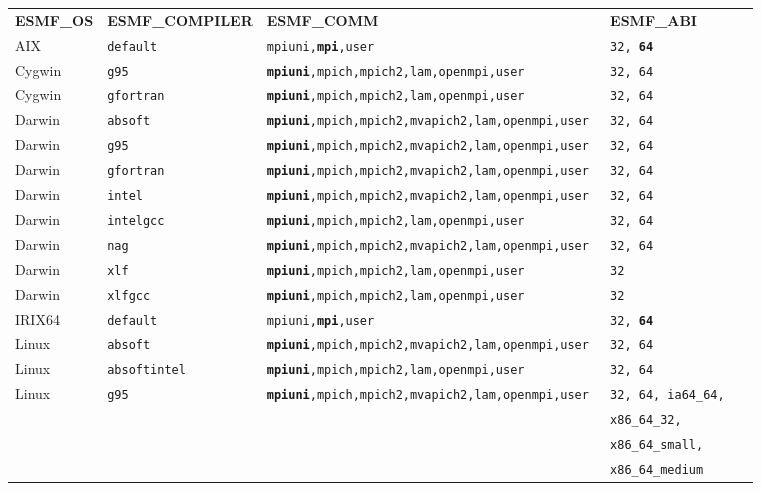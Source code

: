 \begin{tabular}{lllll}
  {\bfseries\footnotesize ESMF\_OS} &{\bfseries\footnotesize ESMF\_COMPILER} & {\bfseries\footnotesize ESMF\_COMM} & {\bfseries\footnotesize ESMF\_ABI} \\

AIX     &\tt default     &\tt mpiuni,{\bf mpi},user      &\tt 32, {\bf 64} \\
Cygwin  &\tt g95         &\tt {\bf mpiuni},mpich,mpich2,lam,openmpi,user &\tt 32, 64 \\
Cygwin  &\tt gfortran    &\tt {\bf mpiuni},mpich,mpich2,lam,openmpi,user &\tt 32, 64 \\
Darwin  &\tt absoft      &\tt {\bf mpiuni},mpich,mpich2,mvapich2,lam,openmpi,user &\tt 32, 64 \\
Darwin  &\tt g95         &\tt {\bf mpiuni},mpich,mpich2,mvapich2,lam,openmpi,user &\tt 32, 64 \\
Darwin  &\tt gfortran    &\tt {\bf mpiuni},mpich,mpich2,mvapich2,lam,openmpi,user &\tt 32, 64 \\
Darwin  &\tt intel       &\tt {\bf mpiuni},mpich,mpich2,mvapich2,lam,openmpi,user &\tt 32, 64 \\
Darwin  &\tt intelgcc    &\tt {\bf mpiuni},mpich,mpich2,lam,openmpi,user &\tt 32, 64 \\
Darwin  &\tt nag         &\tt {\bf mpiuni},mpich,mpich2,mvapich2,lam,openmpi,user &\tt 32, 64 \\
Darwin  &\tt xlf         &\tt {\bf mpiuni},mpich,mpich2,lam,openmpi,user &\tt 32 \\
Darwin  &\tt xlfgcc      &\tt {\bf mpiuni},mpich,mpich2,lam,openmpi,user &\tt 32 \\
IRIX64  &\tt default     &\tt mpiuni,{\bf mpi},user     &\tt 32, {\bf 64} \\
Linux   &\tt absoft      &\tt {\bf mpiuni},mpich,mpich2,mvapich2,lam,openmpi,user &\tt 32, 64 \\
Linux   &\tt absoftintel &\tt {\bf mpiuni},mpich,mpich2,lam,openmpi,user &\tt 32, 64  \\
Linux   &\tt g95         &\tt {\bf mpiuni},mpich,mpich2,mvapich2,lam,openmpi,user &\tt 32, 64, ia64\_64, \\
        &                &                              &\tt x86\_64\_32, \\
        &                &                              &\tt x86\_64\_small, \\
        &                &                              &\tt x86\_64\_medium \\

\end{tabular}
